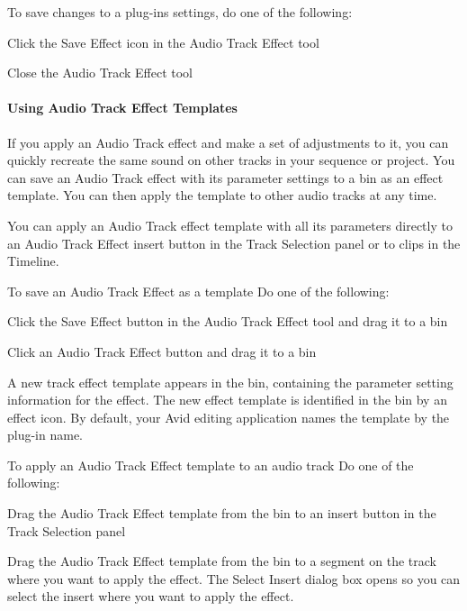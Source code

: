 To save changes to a plug-\/in\textquotesingle{}s settings, do one of the following\+: 
\begin{DoxyItemize}
\item Click the Save Effect icon in the Audio Track Effect tool  
\item Close the Audio Track Effect tool  
\end{DoxyItemize}

\hypertarget{a00361_subsubsectin__media_composer_guide__using_templates}{}\paragraph{Using Audio Track Effect Templates}\label{a00361_subsubsectin__media_composer_guide__using_templates}
 If you apply an Audio Track effect and make a set of adjustments to it, you can quickly recreate the same sound on other tracks in your sequence or project. You can save an Audio Track effect with its parameter settings to a bin as an effect template. You can then apply the template to other audio tracks at any time.

You can apply an Audio Track effect template with all its parameters directly to an Audio Track Effect insert button in the Track Selection panel or to clips in the Timeline.

To save an Audio Track Effect as a template  Do one of the following\+: 
\begin{DoxyItemize}
\item Click the Save Effect button in the Audio Track Effect tool and drag it to a bin  
\item Click an Audio Track Effect button and drag it to a bin  
\end{DoxyItemize}

A new track effect template appears in the bin, containing the parameter setting information for the effect. The new effect template is identified in the bin by an effect icon. By default, your Avid editing application names the template by the plug-\/in name.

To apply an Audio Track Effect template to an audio track  Do one of the following\+: 
\begin{DoxyItemize}
\item Drag the Audio Track Effect template from the bin to an insert button in the Track Selection panel  
\item Drag the Audio Track Effect template from the bin to a segment on the track where you want to apply the effect. The Select Insert dialog box opens so you can select the insert where you want to apply the effect.  
\end{DoxyItemize}

